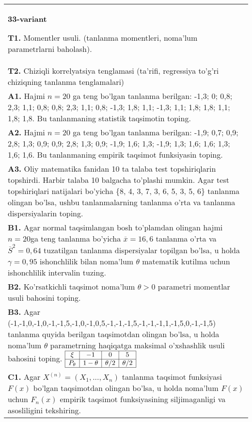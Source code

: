 \documentclass{article}
\begin{document}
\begin{tabular}{m{17cm}}
\textbf{33-variant}
\newline

\textbf{T1.} 
Momentler usuli. (tanlanma momentleri, noma'lum parametrlarni baholash).
\\
\textbf{T2.} 
Chiziqli korrelyatsiya tenglamasi (ta'rifi, regressiya to'g'ri chiziqning tanlanma tenglamalari)
\\
\textbf{A1.} 
Hajmi \(n = 20\) ga teng bo'lgan tanlanma berilgan: -1,3; 0; 0,8; 2,3; 1,1; 0,8; 0,8; 2,3; 1,1; 0,8; -1,3; 1,8; 1,1; -1,3; 1,1; 1,8; 1,8; 1,1; 1,8; 1,8. Bu tanlanmaning statistik taqsimotin toping.
\\
\textbf{A2.} 
Hajmi \(n = 20\) ga teng bo'lgan tanlanma berilgan: -1,9; 0,7; 0,9; 2,8; 1,3; 0,9; 0,9; 2,8; 1,3; 0,9; -1,9; 1,6; 1,3; -1,9; 1,3; 1,6; 1,6; 1,3; 1,6; 1,6. Bu tanlanmaning empirik taqsimot funksiyasin toping.
\\
\textbf{A3.} 
Oliy matematika fanidan 10 ta talaba test topshiriqlarin topshirdi. Harbir talaba 10 balgacha to'plashi mumkin. Agar test topshiriqlari natijalari bo'yicha \{8, 4, 3, 7, 3, 6, 5, 3, 5, 6\} tanlanma olingan bo'lsa, ushbu tanlanmalarning tanlanma o'rta va tanlanma dispersiyalarin toping.
\\
\textbf{B1.} 
Agar normal taqsimlangan bosh to'plamdan olingan hajmi \(n = 20\)ga teng tanlanma bo'yicha \(\overline{x} = 16,6\) tanlanma o'rta va \({\overline{S}}^{2} = 0,64\) tuzatilgan tanlanma dispersiyalar topilgan bo'lsa, u holda \(\gamma = 0,95\) ishonchlilik bilan noma'lum \(\theta\) matematik kutilma uchun ishonchlilik intervalin tuzing.
\\
\textbf{B2.} 
Ko'rsatkichli taqsimot noma'lum \(\theta > 0\) parametri momentlar usuli bahosini toping.
\\
\textbf{B3.} 
Agar (-1,-1,0,-1,0,-1,-1,5,-1,0,-1,0,5,-1,-1,-1,5,-1,-1,-1,1,-1,5,0,-1,-1,5) tanlanma quyida berilgan taqsimotdan olingan bo'lsa, u holda noma'lum \(\theta\) parametrning haqiqatga maksimal o'xshashlik usuli bahosini toping.
$\begin{array}{|c|c|c|c|}
    \hline
    \xi & - 1 & 0 & 5\\
    \hline
    P_{\theta} & 1 - \theta & \theta/2 & \theta/2 \\
    \hline
\end{array}$
\\
\textbf{C1.} 
Agar \(X^{(n)} = \left( X_{1},...,X_{n} \right)\) tanlanma taqsimot funksiyasi \(F(x)\) bo'lgan taqsimotdan olingan bo'lsa, u holda noma'lum \(F(x)\) uchun \(F_{n}(x)\) empirik taqsimot funksiyasining siljimaganligi va asosliligini tekshiring.

\end{tabular}
\end{document}

